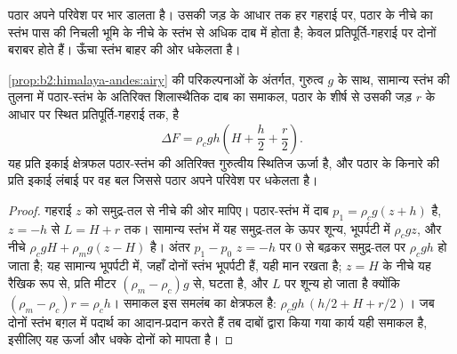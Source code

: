 पठार अपने परिवेश पर भार डालता है। उसकी जड़ के आधार तक हर गहराई पर, पठार के नीचे का
स्तंभ पास की निचली भूमि के नीचे के स्तंभ से अधिक दाब में होता है;
केवल प्रतिपूर्ति-गहराई पर दोनों बराबर होते हैं। ऊँचा स्तंभ बाहर की ओर धकेलता है।

\begin{proposition}[किसी पठार की अतिरिक्त स्थितिज ऊर्जा]\label{prop:b2:himalaya-andes:gpe}
\cref{prop:b2:himalaya-andes:airy} की परिकल्पनाओं के अंतर्गत, गुरुत्व $g$ के साथ, सामान्य स्तंभ की तुलना में
पठार-स्तंभ के अतिरिक्त शिलास्थैतिक दाब का समाकल, पठार के शीर्ष
से उसकी जड़ $r$ के आधार पर स्थित प्रतिपूर्ति-गहराई तक, है
\[
  \Delta F = \rho_c g h \left(H + \frac{h}{2} + \frac{r}{2}\right) .
\]
यह प्रति इकाई क्षेत्रफल पठार-स्तंभ की अतिरिक्त गुरुत्वीय स्थितिज ऊर्जा है, और पठार के किनारे की
प्रति इकाई लंबाई पर वह बल जिससे पठार अपने
परिवेश पर धकेलता है।
\end{proposition}

\begin{proof}
गहराई $z$ को समुद्र-तल से नीचे की ओर मापिए। पठार-स्तंभ में दाब $p_1 =
\rho_c g (z + h)$ है, $z = -h$ से $L = H + r$ तक। सामान्य स्तंभ में यह समुद्र-तल के ऊपर शून्य,
भूपर्पटी में $\rho_c g z$, और नीचे $\rho_c g H + \rho_m g (z - H)$ है। अंतर $p_1
- p_0$ $z = -h$ पर 0 से बढ़कर समुद्र-तल पर $\rho_c g h$ हो जाता है; यह सामान्य भूपर्पटी में, जहाँ दोनों स्तंभ
भूपर्पटी हैं, यही मान रखता है; $z = H$ के नीचे यह रैखिक रूप से, प्रति मीटर
$(\rho_m - \rho_c) g$ से, घटता है, और $L$ पर शून्य हो जाता है क्योंकि $(\rho_m - \rho_c) r = \rho_c
h$। समाकल इस समलंब का क्षेत्रफल है: $\rho_c g h\,(h/2 + H + r/2)$। जब दोनों स्तंभ बग़ल में
पदार्थ का आदान-प्रदान करते हैं तब दाबों द्वारा किया गया कार्य
यही समाकल है, इसीलिए यह ऊर्जा और धक्के दोनों को मापता है।
\end{proof}

